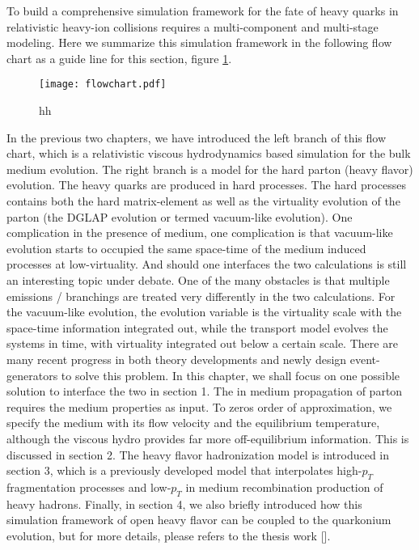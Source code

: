 To build a comprehensive simulation framework for the fate of heavy quarks in relativistic heavy-ion collisions requires a multi-component and multi-stage modeling.
Here we summarize this simulation framework in the following flow chart as a guide line for this section, figure \ref{fig:flowchart}.

\begin{figure}
\centering
\texttt{[image: flowchart.pdf]}
\caption{hh}
\label{fig:flowchart}
\end{figure}

In the previous two chapters, we have introduced the left branch of this flow chart, which is a relativistic viscous hydrodynamics based simulation for the bulk medium evolution.
The right branch is a model for the hard parton (heavy flavor) evolution.
The heavy quarks are produced in hard processes.
The hard processes contains both the hard matrix-element as well as the virtuality evolution of the parton (the DGLAP evolution or termed vacuum-like evolution).
One complication in the presence of medium, one complication is that vacuum-like evolution starts to occupied the same space-time of the medium induced processes at low-virtuality.
And should one interfaces the two calculations is still an interesting topic under debate.
One of the many obstacles is that multiple emissions / branchings are treated very differently in the two calculations.
For the vacuum-like evolution, the evolution variable is the virtuality scale with the space-time information integrated out, while the transport model evolves the systems in time, with virtuality integrated out below a certain scale.
There are many recent progress in both theory developments and newly design event-generators to solve this problem.
In this chapter, we shall focus on one possible solution to interface the two in section 1.
The in medium propagation of parton requires the medium properties as input. 
To zeros order of approximation, we specify the medium with its flow velocity and the equilibrium temperature, although the viscous hydro provides far more off-equilibrium information. 
This is discussed in section 2.
The heavy flavor hadronization model is introduced in section 3, which is a previously developed model that interpolates high-$p_T$ fragmentation processes and low-$p_T$ in medium recombination production of heavy hadrons.
Finally, in section 4, we also briefly introduced how this simulation framework of open heavy flavor can be coupled to the quarkonium evolution, but for more details, please refers to the thesis work [].

